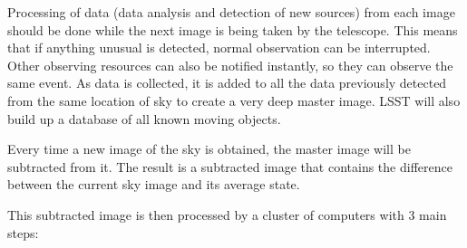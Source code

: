 \documentclass[times]{cpeauth}
\begin{document}
Processing of data (data analysis and detection of new sources) from each image
should be done while the next image is being taken by the telescope.  This means
that if anything unusual is detected, normal observation can be
interrupted. Other observing resources can also be notified instantly, so they
can observe the same event. As data is collected, it is added to all the data
previously detected from the same location of sky to create a very deep master
image. LSST will also build up a database of all known moving objects.

Every time a new image of the sky is obtained, the master image will be
subtracted from it. The result is a subtracted image that contains the
difference between the current sky image and its average state.

This subtracted image is then processed by a cluster of computers with 3 main
steps:
\end{document}
